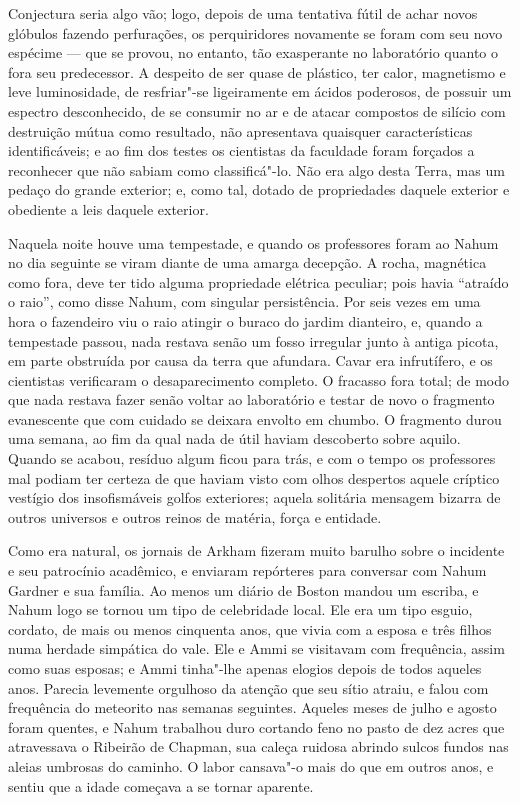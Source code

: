 Conjectura seria algo vão; logo, depois de uma tentativa fútil de achar
novos glóbulos fazendo perfurações, os perquiridores novamente se foram
com seu novo espécime --- que se provou, no entanto, tão exasperante no
laboratório quanto o fora seu predecessor. A despeito de ser quase de
plástico, ter calor, magnetismo e leve luminosidade, de resfriar"-se
ligeiramente em ácidos poderosos, de possuir um espectro desconhecido,
de se consumir no ar e de atacar compostos de silício com destruição
mútua como resultado, não apresentava quaisquer características
identificáveis; e ao fim dos testes os cientistas da faculdade foram
forçados a reconhecer que não sabiam como classificá"-lo. Não era algo
desta Terra, mas um pedaço do grande exterior; e, como tal, dotado de
propriedades daquele exterior e obediente a leis daquele exterior.

Naquela noite houve uma tempestade, e quando os professores foram ao
Nahum no dia seguinte se viram diante de uma amarga decepção. A rocha,
magnética como fora, deve ter tido alguma propriedade elétrica peculiar;
pois havia ``atraído o raio'', como disse Nahum, com singular
persistência. Por seis vezes em uma hora o fazendeiro viu o raio atingir
o buraco do jardim dianteiro, e, quando a tempestade passou, nada
restava senão um fosso irregular junto à antiga picota, em parte
obstruída por causa da terra que afundara. Cavar era infrutífero, e os
cientistas verificaram o desaparecimento completo. O fracasso fora
total; de modo que nada restava fazer senão voltar ao laboratório e
testar de novo o fragmento evanescente que com cuidado se deixara
envolto em chumbo. O fragmento durou uma semana, ao fim da qual nada de
útil haviam descoberto sobre aquilo. Quando se acabou, resíduo algum
ficou para trás, e com o tempo os professores mal podiam ter certeza de
que haviam visto com olhos despertos aquele críptico vestígio dos
insofismáveis golfos exteriores; aquela solitária mensagem bizarra de
outros universos e outros reinos de matéria, força e entidade.

Como era natural, os jornais de Arkham fizeram muito barulho sobre o
incidente e seu patrocínio acadêmico, e enviaram repórteres para
conversar com Nahum Gardner e sua família. Ao menos um diário de Boston
mandou um escriba, e Nahum logo se tornou um tipo de celebridade local.
Ele era um tipo esguio, cordato, de mais ou menos cinquenta anos, que
vivia com a esposa e três filhos numa herdade simpática do vale. Ele e
Ammi se visitavam com frequência, assim como suas esposas; e Ammi
tinha"-lhe apenas elogios depois de todos aqueles anos. Parecia levemente
orgulhoso da atenção que seu sítio atraiu, e falou com frequência do
meteorito nas semanas seguintes. Aqueles meses de julho e agosto foram
quentes, e Nahum trabalhou duro cortando feno no pasto de dez acres que
atravessava o Ribeirão de Chapman, sua caleça ruidosa abrindo sulcos
fundos nas aleias umbrosas do caminho. O labor cansava"-o mais do que em
outros anos, e sentiu que a idade começava a se tornar aparente.

